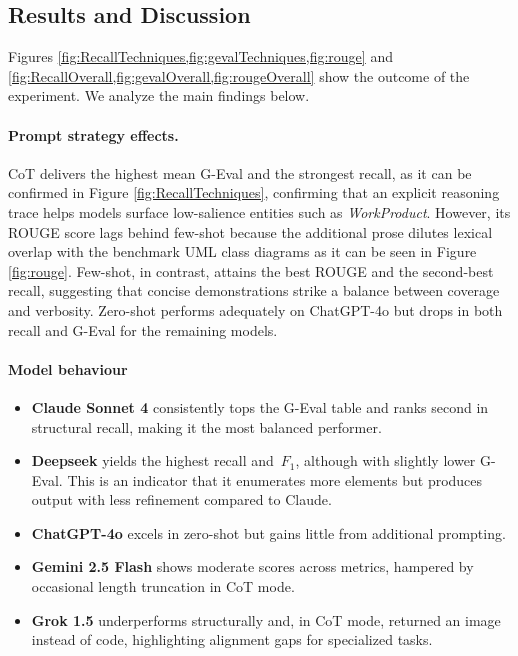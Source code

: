 \subsection{Results and Discussion}

Figures \cref{fig:RecallTechniques,fig:gevalTechniques,fig:rouge} and \cref{fig:RecallOverall,fig:gevalOverall,fig:rougeOverall} show the outcome of the experiment. We analyze the main findings below.

\paragraph{Prompt strategy effects.}
CoT delivers the highest mean G-Eval and the strongest recall, as it can be confirmed in Figure \cref{fig:RecallTechniques}, confirming that an explicit reasoning trace helps models surface low-salience entities such as \textit{WorkProduct}. However, its ROUGE score lags behind few-shot because the additional prose dilutes lexical overlap with the benchmark UML class diagrams as it can be seen in Figure \cref{fig:rouge}.
Few-shot, in contrast, attains the best ROUGE and the second-best recall, suggesting that concise demonstrations strike a balance between coverage and verbosity. Zero-shot performs adequately on ChatGPT-4o but drops in both recall and G-Eval for the remaining models.

\paragraph{Model behaviour}
\begin{itemize}
    \item \textbf{Claude Sonnet 4} consistently tops the G-Eval table and ranks second in structural recall, making it the most balanced performer.
    \item \textbf{Deepseek} yields the highest recall and~$F_1$, although with slightly lower G-Eval. This is an indicator that it enumerates more elements but produces output with less refinement compared to Claude.
    \item \textbf{ChatGPT-4o} excels in zero-shot but gains little from additional prompting.
    \item \textbf{Gemini 2.5 Flash} shows moderate scores across metrics, hampered by occasional length truncation in CoT mode.
    \item \textbf{Grok 1.5} underperforms structurally and, in CoT mode, returned an image instead of code, highlighting alignment gaps for specialized tasks.
\end{itemize}


